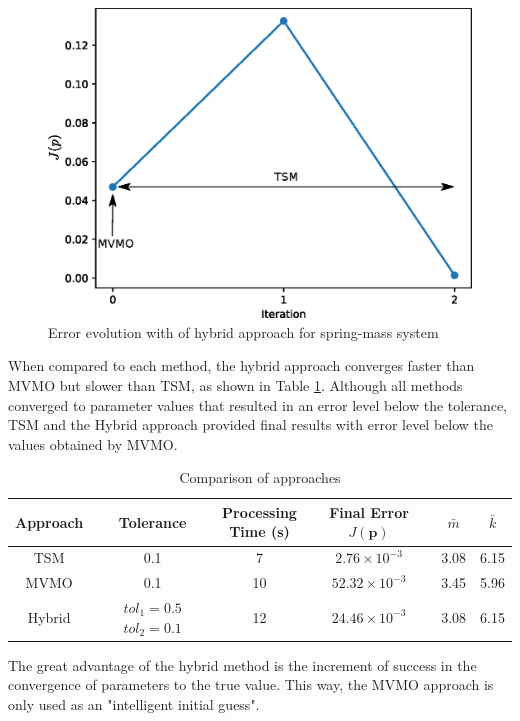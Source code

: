 \begin{figure}[h]
	\caption{Error evolution with of hybrid approach for spring-mass system}
	\begin{center}
		\includegraphics[scale=0.7]{Images/Hybrid_conv_.eps}
	\end{center}
	\label{fig: Hybrid_conv}
\end{figure}

When compared to each method, the hybrid approach converges faster than MVMO but slower than TSM, as shown in Table \ref{tab: SM}. Although all methods converged to parameter values that resulted in an error level below the tolerance, TSM and the Hybrid approach provided final results with error level below the values obtained by MVMO.

\begin{table}[h]
	\caption{Comparison of approaches}
	\begin{center}
	\begin{tabular}{c|ccccc}
		Approach & Tolerance & \shortstack{Processing \\ Time (s)} & \shortstack{Final Error \\ $J(\mathbf{p})$} & $\bar{m}$ & $\bar{k}$ \\
		\hline
		TSM  & 0.1 & 7  & $2.76\times 10^{-3}$ & 3.08 & 6.15 \\
		MVMO  & 0.1 & 10 & $52.32\times 10^{-3}$ & 3.45 & 5.96 \\
		Hybrid  & \shortstack{$tol_{1}=0.5$ \\ $tol_{2}=0.1$} & 12 & $24.46\times 10^{-3}$ & 3.08 & 6.15
	\end{tabular}
	\end{center}
	\label{tab: SM}
\end{table}

The great advantage of the hybrid method is the increment of success in the convergence of parameters to the true value. This way, the MVMO approach is only used as an "intelligent initial guess".
